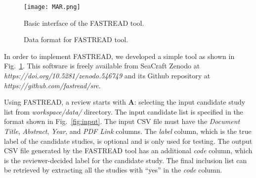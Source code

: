 \documentclass{svjour3}
\theoremstyle{break}
\begin{document}
\begin{figure}[t]
    \centering
    \texttt{[image: MAR.png]}
    \caption{Basic interface of the FASTREAD tool.}
    \label{fig:FASTREAD}
\end{figure}


\begin{figure}[t]
    \centering
    
    \caption{Data format for FASTREAD tool.}
    \label{fig:csv}
\end{figure}

In order to implement FASTREAD, we developed a simple tool as shown in Fig.~\ref{fig:FASTREAD}. This software is freely available from SeaCraft Zenodo at \textit{https://doi.org/10.5281/zenodo.546749} and its Github repository at \textit{https://github.com/fastread/src}. 


Using FASTREAD, a review starts with \textbf{A}: selecting the input candidate study list from \textit{workspace/data/} directory. The input candidate list is specified in the format shown in Fig.~\ref{fig:input}. The input CSV file must have the \textit{Document Title}, \textit{Abstract}, \textit{Year}, and \textit{PDF Link} columns. The \textit{label} column, which is the true label of the candidate studies, is optional and is only used for testing. The output CSV file generated by the FASTREAD tool has an additional \textit{code} column, which is the reviewer-decided label for the candidate study. The final inclusion list can be retrieved by extracting all the studies with ``yes'' in the \textit{code} column.
\end{document}
